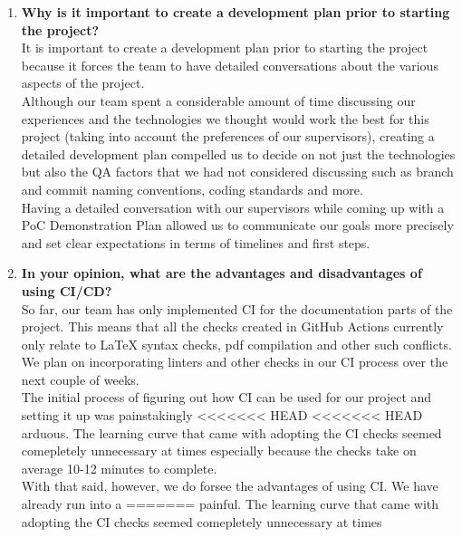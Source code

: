 \documentclass{article}
\begin{document}
\begin{enumerate}
    \item \textbf{Why is it important to create a development plan prior to starting the
    project?}\\
    \newline
    It is important to create a development plan prior to starting the project because
    it forces the team to have detailed conversations about the various aspects of the project.\\
    \newline
    Although our team spent a considerable amount of time discussing our experiences and the
    technologies we thought would work the best for this project (taking into account the preferences
    of our supervisors), creating a detailed development plan compelled us to decide on not just the 
    technologies but also the QA factors that we had not considered discussing such as branch and commit 
    naming conventions, coding standards and more.\\
    \newline
    Having a detailed conversation with our supervisors while coming up with a PoC Demonstration
    Plan allowed us to communicate our goals more precisely and set clear expectations in terms of timelines
    and first steps.
    \item \textbf{In your opinion, what are the advantages and disadvantages of using
    CI/CD?}\\
    \newline
    So far, our team has only implemented CI for the documentation parts of the project. This means that
    all the checks created in GitHub Actions currently only relate to LaTeX syntax checks, pdf compilation
    and other such conflicts. We plan on incorporating linters and other checks in our CI process over the
    next couple of weeks.\\
    \newline
    The initial process of figuring out how CI can be used for our project and setting it up was painstakingly
<<<<<<< HEAD
<<<<<<< HEAD
    arduous. The learning curve that came with adopting the CI checks seemed comepletely unnecessary at times
    especially because the checks take on average 10-12 minutes to complete.\\
    \newline
    With that said, however, we do forsee the advantages of using CI. We have already run into a
=======
    painful. The learning curve that came with adopting the CI checks seemed comepletely unnecessary at times

\end{enumerate}
\end{document}
